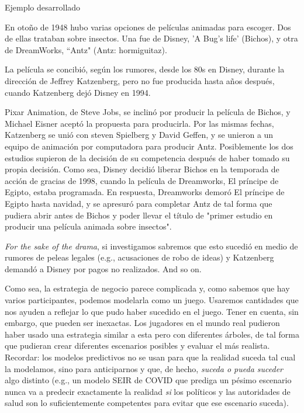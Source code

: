 \documentclass[12pt]{scrartcl}
\begin{document}
\begin{exbox}{Ejemplo desarrollado}
	
	En otoño de 1948 hubo varias opciones de películas animadas para escoger. Dos de ellas trataban sobre insectos. Una fue de Disney, 'A Bug's life' (Bichos), y otra de DreamWorks, ``Antz" (Antz: hormiguitaz). 
	
	La película se concibió, según los rumores, desde los 80s en Disney, durante la dirección de Jeffrey Katzenberg, pero no fue producida hasta años después, cuando Katzenberg dejó Disney en 1994. 
	
	Pixar Animation, de Steve Jobs, se inclinó por producir la película de Bichos, y Michael Eisner aceptó la propuesta para producirla. Por las mismas fechas, Katzenberg se unió con steven Spielberg y David Geffen, y se unieron a un equipo de animación por computadora para producir Antz. Posiblemente los dos estudios supieron de la decisión de su competencia después de haber tomado su propia decisión. Como sea, Disney decidió liberar Bichos en la temporada de acción de gracias de 1998, cuando la película de Dreamworks, El príncipe de Egipto, estaba programada. En respuesta, Dreamworks demoró El príncipe de Egipto hasta navidad, y se apresuró para completar Antz de tal forma que pudiera abrir antes de Bichos y poder llevar el título de "primer estudio en producir una película animada sobre insectos". 
	
	\textit{For the sake of the drama}, si investigamos sabremos que esto sucedió en medio de rumores de peleas legales (e.g., acusaciones de robo de ideas) y Katzenberg demandó a Disney por pagos no realizados. And so on.
	
	Como sea, la estrategia de negocio parece complicada y, como sabemos que hay varios participantes, podemos modelarla como un juego. Usaremos cantidades que nos ayuden a reflejar lo que pudo haber sucedido en el juego. Tener en cuenta, sin embargo, que pueden ser inexactas. Los jugadores en el mundo real pudieron haber usado una estrategia similar a esta pero con diferentes árboles, de tal forma que pudieran crear diferentes escenarios posibles y evaluar el más realista. Recordar: los modelos predictivos no se usan para que la realidad suceda tal cual la modelamos, sino para anticiparnos y que, de hecho, \textit{suceda o pueda suceder} algo distinto (e.g., un modelo SEIR de COVID que prediga un pésimo escenario nunca va a predecir exactamente la realidad \textit{si} los políticos y las autoridades de salud son lo suficientemente competentes para evitar que ese escenario suceda).
	

\end{exbox}
\end{document}
